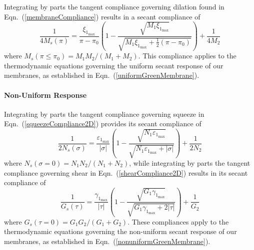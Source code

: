 Integrating by parts the tangent compliance governing dilation found in Eqn.~(\ref{membraneCompliance}) results in a secant compliance of
\begin{equation}
    \frac{1}{4M_s (\pi)} = \frac{\xi_{1_{\max}}}{\pi - \pi_0} \left( 
    1 - \frac{\sqrt{M_1 \xi_{1_{\max}}}}
    {\sqrt{M_1 \xi_{1_{\max}} + \tfrac{1}{2} ( \pi - \pi_0 )}} \right) + 
    \frac{1}{4M_2}
\end{equation}
where $M_s (\pi \! \leq \! \pi_0) = M_1 M_2 / ( M_1 + M_2 )$.  This compliance applies to the thermo\-dynamic equations governing the uniform secant response of our membranes, as established in Eqn.~(\ref{uniformGreenMembrane}).

\paragraph{Non-Uniform Response}

Integrating by parts the tangent compliance governing squeeze in Eqn.~(\ref{squeezeCompliance2D}) provides its secant compliance of
\begin{equation}
\frac{1}{2N_s (\sigma)} = 
\frac{\varepsilon_{1_{\max}}}{|\sigma|} \left(
1 - \frac{\sqrt{N_1 \varepsilon_{1_{\max}}}}
{\sqrt{N_1 \varepsilon_{1_{\max}} + | \sigma |}} \right) + 
\frac{1}{2N_2}
\end{equation}
where $N_s (\sigma \! = \! 0) = N_1 N_2 / (N_1 + N_2)$, while
integrating by parts the tangent compliance governing shear in Eqn.~(\ref{shearCompliance2D}) results in its secant compliance of
\begin{equation}
    \frac{1}{G_s (\tau)} = 
    \frac{\gamma_{1_{\max}}}{|\tau|} \left(
    1 - \frac{\sqrt{G_1 \gamma_{1_{\max}}}}
    {\sqrt{G_1 \gamma_{1_{\max}} + 2 | \tau |}} \right) + 
    \frac{1}{G_2}
\end{equation}
where $G_s (\tau \! = \! 0) = G_1 G_2 / (G_1 + G_2)$.  These compliances apply to the thermo\-dynamic equations governing the non-uniform secant response of our membranes, as established in Eqn.~(\ref{nonuniformGreenMembrane}).